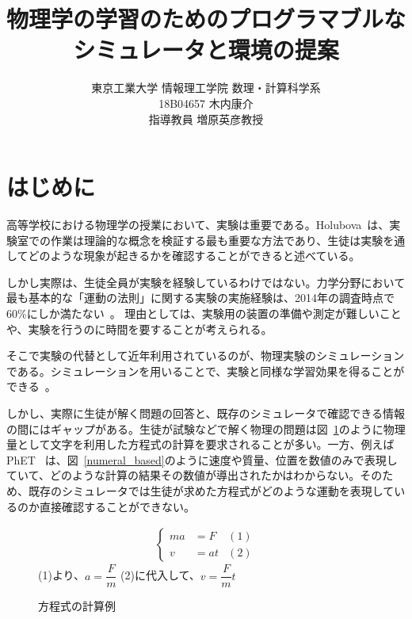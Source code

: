 \documentclass[11pt, a4paper, oneside, twocolumn, dvipdfmx]{jsarticle}
\title{物理学の学習のためのプログラマブルな
\\シミュレータと環境の提案}
\author{東京工業大学 情報理工学院 数理・計算科学系\\18B04657 木内康介\\指導教員 増原英彦教授}
\date{}
\begin{document}
\maketitle

\section{はじめに} \label{intro}
高等学校における物理学の授業において、実験は重要である。Holubova~\cite{holubova_2019}は、実験室での作業は理論的な概念を検証する最も重要な方法であり、生徒は実験を通してどのような現象が起きるかを確認することができると述べている。%

しかし実際は、生徒全員が実験を経験しているわけではない。力学分野において最も基本的な「運動の法則」に関する実験の実施経験は、2014年の調査時点で60\%にしか満たない~\cite{2015KJ00010038066}。
理由としては、実験用の装置の準備や測定が難しいことや、実験を行うのに時間を要することが考えられる。

そこで実験の代替として近年利用されているのが、物理実験のシミュレーションである。シミュレーションを用いることで、実験と同様な学習効果を得ることができる~\cite{ajredini_real_2014}。

しかし、実際に生徒が解く問題の回答と、既存のシミュレータで確認できる情報の間にはギャップがある。生徒が試験などで解く物理の問題は図~\ref{symbol_based}のように物理量として文字を利用した方程式の計算を要求されることが多い。一方、例えばPhET~\cite{perkins_phet_2006} は、図~\ref{numeral_based}のように速度や質量、位置を数値のみで表現していて、どのような計算の結果その数値が導出されたかはわからない。そのため、既存のシミュレータでは生徒が求めた方程式がどのような運動を表現しているのか直接確認することができない。

\begin{figure}[b]
\begin{align}
  \left\{
  \begin{aligned}
    ma &= F & (1)\\
    v &= at & (2)
  \end{aligned}
  \right. \nonumber
\end{align}
(1)より、$a = \dfrac{F}{m}$ \quad (2)に代入して、$v = \dfrac{F}{m}t$
\centering
\caption{方程式の計算例} \label{symbol_based}
\end{figure}
\end{document}
